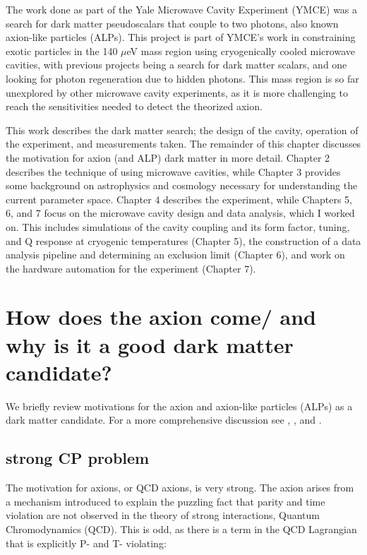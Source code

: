 \documentclass[12pt,twosides]{book}
\begin{document}
The work done as part of the Yale Microwave Cavity Experiment (YMCE) was a search for dark matter pseudoscalars that couple to two photons, also known axion-like particles (ALPs). This project is part of YMCE's work in constraining exotic particles in the 140 $\mu$eV mass region using cryogenically cooled microwave cavities, with previous projects being a search for dark matter scalars, and one looking for photon regeneration due to hidden photons. This mass region is so far unexplored by other microwave cavity experiments, as it is more challenging to reach the sensitivities needed to detect the theorized axion.

This work describes the dark matter search; the design of the cavity, operation of the experiment, and measurements taken. The remainder of this chapter discusses the motivation for axion (and ALP) dark matter in more detail. Chapter 2 describes the technique of using microwave cavities, while Chapter 3 provides some background on astrophysics and cosmology necessary for understanding the current parameter space. Chapter 4 describes the experiment, while Chapters 5, 6, and 7 focus on the microwave cavity design and data analysis, which I worked on. This includes simulations of the cavity coupling and its form factor, tuning, and Q response at cryogenic temperatures (Chapter 5), the construction of a data analysis pipeline and determining an exclusion limit (Chapter 6), and work on the hardware automation for the experiment (Chapter 7).

\section{How does the axion come/ and why is it a good dark matter candidate?}

We briefly review motivations for the axion and axion-like particles (ALPs) as a dark matter candidate. For a more comprehensive discussion see \cite{hewett12}, \cite{arias12}, and \cite{kim87}. 

\subsection{strong CP problem}

The motivation for axions, or QCD axions, is very strong. The axion arises from a mechanism introduced to explain the puzzling fact that parity and time violation are not observed in the theory of strong interactions, Quantum Chromodynamics (QCD). This is odd, as there is a term in the QCD Lagrangian that is explicitly P- and T- violating:
\end{document}

